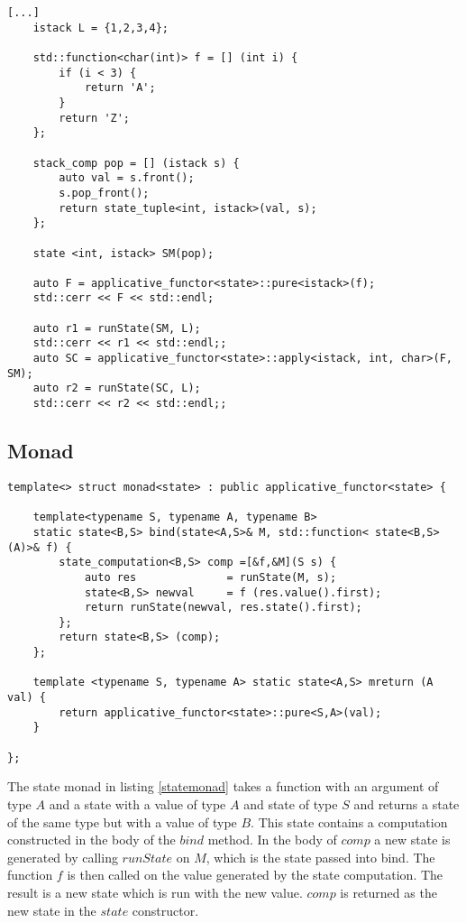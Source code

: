 \documentclass[12pt,fleqn]{article}
\begin{document}
%
%
%
\begin{minipage}{\linewidth}
\begin{lstlisting}[caption=Example of the state applicative functor,label=stateappexample]
[...]
	istack L = {1,2,3,4};
	
	std::function<char(int)> f = [] (int i) {
		if (i < 3) {
			return 'A';
		}
		return 'Z';
	};

	stack_comp pop = [] (istack s) {
		auto val = s.front();
		s.pop_front();
		return state_tuple<int, istack>(val, s);
	};
	
	state <int, istack> SM(pop);

	auto F = applicative_functor<state>::pure<istack>(f);
	std::cerr << F << std::endl;

	auto r1 = runState(SM, L);
	std::cerr << r1 << std::endl;;
	auto SC = applicative_functor<state>::apply<istack, int, char>(F, SM);
	auto r2 = runState(SC, L);
	std::cerr << r2 << std::endl;;

\end{lstlisting}
\end{minipage}
%
%
%




%
%
\subsection{Monad}
%

%
%
%
\begin{minipage}{\linewidth}
\begin{lstlisting}[caption=state monad, label=statemonad]
template<> struct monad<state> : public applicative_functor<state> {

	template<typename S, typename A, typename B>
	static state<B,S> bind(state<A,S>& M, std::function< state<B,S> (A)>& f) {
		state_computation<B,S> comp =[&f,&M](S s) {
			auto res              = runState(M, s);
			state<B,S> newval     = f (res.value().first);
			return runState(newval, res.state().first);
		};
		return state<B,S> (comp);
	};

	template <typename S, typename A> static state<A,S> mreturn (A val) {
		return applicative_functor<state>::pure<S,A>(val);
	}

};
\end{lstlisting}
\end{minipage}
%
%
%


The state monad in listing \ref{statemonad} takes a function with an argument of type $A$ and a state with a value of type $A$ and state of type $S$ and 
returns a state of the same type but with a value of type $B$.
This state contains a computation constructed in the body of the $bind$ method.
In the body of $comp$ a new state is generated by calling $runState$ on $M$, which is the state passed into bind. 
The function $f$ is then called on the value generated by the state computation.
The result is a new state which is run with the new value.
$comp$ is returned as the new state in the $state$ constructor.
\end{document}
